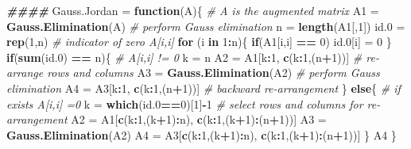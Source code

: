 \documentclass[
]{book}
\newenvironment{Shaded}{\begin{snugshade}}{\end{snugshade}}
\newcommand{\CommentTok}[1]{\textcolor[rgb]{0.56,0.35,0.01}{\textit{#1}}}
\newcommand{\ControlFlowTok}[1]{\textcolor[rgb]{0.13,0.29,0.53}{\textbf{#1}}}
\newcommand{\DecValTok}[1]{\textcolor[rgb]{0.00,0.00,0.81}{#1}}
\newcommand{\DocumentationTok}[1]{\textcolor[rgb]{0.56,0.35,0.01}{\textbf{\textit{#1}}}}
\newcommand{\FloatTok}[1]{\textcolor[rgb]{0.00,0.00,0.81}{#1}}
\newcommand{\FunctionTok}[1]{\textcolor[rgb]{0.13,0.29,0.53}{\textbf{#1}}}
\newcommand{\NormalTok}[1]{#1}
\newcommand{\OtherTok}[1]{\textcolor[rgb]{0.56,0.35,0.01}{#1}}
\newcommand{\SpecialCharTok}[1]{\textcolor[rgb]{0.81,0.36,0.00}{\textbf{#1}}}
\begin{document}
\begin{Shaded}
\begin{Highlighting}[]
\DocumentationTok{\#\#\#\#}
\NormalTok{Gauss.Jordan }\OtherTok{=} \ControlFlowTok{function}\NormalTok{(A)\{}
  \CommentTok{\# A is the augmented matrix}
\NormalTok{  A1 }\OtherTok{=} \FunctionTok{Gauss.Elimination}\NormalTok{(A)           }\CommentTok{\# perform Gauss elimination}
\NormalTok{  n }\OtherTok{=} \FunctionTok{length}\NormalTok{(A1[,}\DecValTok{1}\NormalTok{])}
\NormalTok{  id}\FloatTok{.0} \OtherTok{=} \FunctionTok{rep}\NormalTok{(}\DecValTok{1}\NormalTok{,n)                     }\CommentTok{\# indicator of zero A[i,i]}
  \ControlFlowTok{for}\NormalTok{ (i }\ControlFlowTok{in} \DecValTok{1}\SpecialCharTok{:}\NormalTok{n)\{}
    \ControlFlowTok{if}\NormalTok{(A1[i,i] }\SpecialCharTok{==} \DecValTok{0}\NormalTok{) id}\FloatTok{.0}\NormalTok{[i] }\OtherTok{=} \DecValTok{0}
\NormalTok{  \}}
  \ControlFlowTok{if}\NormalTok{(}\FunctionTok{sum}\NormalTok{(id}\FloatTok{.0}\NormalTok{) }\SpecialCharTok{==}\NormalTok{ n)\{                  }\CommentTok{\# A[i,i] != 0}
\NormalTok{        k }\OtherTok{=}\NormalTok{ n}
\NormalTok{        A2 }\OtherTok{=}\NormalTok{ A1[k}\SpecialCharTok{:}\DecValTok{1}\NormalTok{, }\FunctionTok{c}\NormalTok{(k}\SpecialCharTok{:}\DecValTok{1}\NormalTok{,(n}\SpecialCharTok{+}\DecValTok{1}\NormalTok{))]     }\CommentTok{\# re{-}arrange rows and columns}
\NormalTok{        A3 }\OtherTok{=} \FunctionTok{Gauss.Elimination}\NormalTok{(A2)     }\CommentTok{\# perform Gauss elimination}
\NormalTok{        A4 }\OtherTok{=}\NormalTok{ A3[k}\SpecialCharTok{:}\DecValTok{1}\NormalTok{, }\FunctionTok{c}\NormalTok{(k}\SpecialCharTok{:}\DecValTok{1}\NormalTok{,(n}\SpecialCharTok{+}\DecValTok{1}\NormalTok{))]     }\CommentTok{\# backward re{-}arrangement}
\NormalTok{      \} }\ControlFlowTok{else}\NormalTok{\{                          }\CommentTok{\# if exists A[i,i] =0}
\NormalTok{        k }\OtherTok{=} \FunctionTok{which}\NormalTok{(id}\FloatTok{.0}\SpecialCharTok{==}\DecValTok{0}\NormalTok{)[}\DecValTok{1}\NormalTok{]}\SpecialCharTok{{-}}\DecValTok{1}   \CommentTok{\# select rows and columns for re{-}arrangement}
\NormalTok{        A2 }\OtherTok{=}\NormalTok{ A1[}\FunctionTok{c}\NormalTok{(k}\SpecialCharTok{:}\DecValTok{1}\NormalTok{,(k}\SpecialCharTok{+}\DecValTok{1}\NormalTok{)}\SpecialCharTok{:}\NormalTok{n), }\FunctionTok{c}\NormalTok{(k}\SpecialCharTok{:}\DecValTok{1}\NormalTok{,(k}\SpecialCharTok{+}\DecValTok{1}\NormalTok{)}\SpecialCharTok{:}\NormalTok{(n}\SpecialCharTok{+}\DecValTok{1}\NormalTok{))]}
\NormalTok{        A3 }\OtherTok{=} \FunctionTok{Gauss.Elimination}\NormalTok{(A2)}
\NormalTok{        A4 }\OtherTok{=}\NormalTok{ A3[}\FunctionTok{c}\NormalTok{(k}\SpecialCharTok{:}\DecValTok{1}\NormalTok{,(k}\SpecialCharTok{+}\DecValTok{1}\NormalTok{)}\SpecialCharTok{:}\NormalTok{n), }\FunctionTok{c}\NormalTok{(k}\SpecialCharTok{:}\DecValTok{1}\NormalTok{,(k}\SpecialCharTok{+}\DecValTok{1}\NormalTok{)}\SpecialCharTok{:}\NormalTok{(n}\SpecialCharTok{+}\DecValTok{1}\NormalTok{))]}
\NormalTok{      \}}
\NormalTok{   A4}
\NormalTok{\}}
\end{Highlighting}
\end{Shaded}
\end{document}
